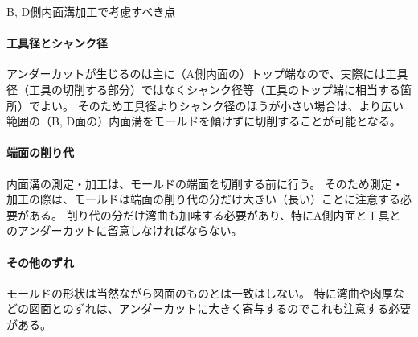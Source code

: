 \begin{Column}{B, D側内面溝加工で考慮すべき点}
\paragraph{工具径とシャンク径}
アンダーカットが生じるのは主に（A側内面の）トップ端なので、実際には工具径（工具の切削する部分）ではなくシャンク径等（工具のトップ端に相当する箇所）でよい。
そのため工具径よりシャンク径のほうが小さい場合は、より広い範囲の（B, D面の）内面溝をモールドを傾けずに切削することが可能となる。
\tcbline*
\paragraph{端面の削り代}
内面溝の測定・加工は、モールドの端面を切削する前に行う。
そのため測定・加工の際は、モールドは端面の削り代の分だけ大きい（長い）ことに注意する必要がある。
削り代の分だけ湾曲も加味する必要があり、特にA側内面と工具とのアンダーカットに留意しなければならない。
\tcbline*
\paragraph{その他のずれ}
モールドの形状は当然ながら図面のものとは一致はしない。
特に湾曲や肉厚などの図面とのずれは、アンダーカットに大きく寄与するのでこれも注意する必要がある。
\end{Column}





\clearpage
